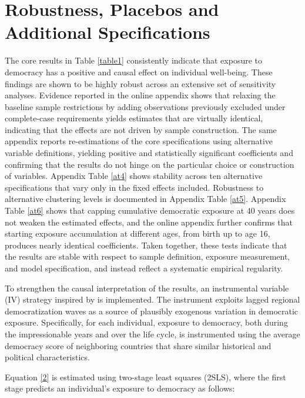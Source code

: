 \documentclass[11pt]{article}
\newcommand{\aaa}[1]{\cOne{#1}} %
\begin{document}
\vspace*{0.5cm}
\section{Robustness, Placebos and Additional Specifications}\label{Robustness}

The core results in Table \ref{table1} consistently indicate that exposure to democracy has a positive and causal effect on individual well-being. These findings are shown to be highly robust across an extensive set of sensitivity analyses. Evidence reported in the online appendix shows that relaxing the baseline sample restrictions by adding observations previously excluded under complete-case requirements yields estimates that are virtually identical, indicating that the effects are not driven by sample construction. The same appendix reports re-estimations of the core specifications using alternative variable definitions, yielding positive and statistically significant coefficients and confirming that the results do not hinge on the particular choice or construction of variables. Appendix Table \ref{at4} shows stability across ten alternative specifications that vary only in the fixed effects included. Robustness to alternative clustering levels is documented in Appendix Table \ref{at5}. Appendix Table \ref{at6} shows that capping cumulative democratic exposure at 40 years does not weaken the estimated effects, and the online appendix further confirms that starting exposure accumulation at different ages, from birth up to age 16, produces nearly identical coefficients. Taken together, these tests indicate that the results are stable with respect to sample definition, exposure measurement, and model specification, and instead reflect a systematic empirical regularity.

To strengthen the causal interpretation of the results, an instrumental variable (IV) strategy inspired by \aaa{Acemoglu2019} is implemented. The instrument exploits lagged regional democratization waves as a source of plausibly exogenous variation in democratic exposure. Specifically, for each individual, exposure to democracy, both during the impressionable years and over the life cycle, is instrumented using the average democracy score of neighboring countries that share similar historical and political characteristics.

Equation \eqref{2} is estimated using two-stage least squares (2SLS), where the first stage predicts an individual’s exposure to democracy as follows:
\end{document}
